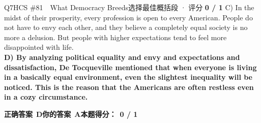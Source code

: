 \begin{qblock}{Q7\quad HCS \#81\ \ What Democracy Breeds}{选择最佳概括段 · 评分 \textcolor{cAccent}{\bfseries 0 / 1}}
{C) In the midst of their prosperity, every profession is open to every American. People do not have to envy each other, and they believe a completely equal society is no more a delusion. But people with higher expectations tend to feel more disappointed with life.\\
{\color{cFix}\textbf{D) By analyzing political equality and envy and expectations and dissatisfaction, De Tocqueville mentioned that when everyone is living in a basically equal environment, even the slightest inequality will be noticed. This is the reason that the Americans are often restless even in a cozy circumstance.}}}
\par\smallskip
\textbf{正确答案}\ \textcolor{cFix}{\bfseries D}\qquad\textbf{你的答案}\ {\color{cWrong}\bfseries A}\qquad\textbf{本题得分：}\ {\color{cAccent}\bfseries 0 / 1}
\end{qblock}

